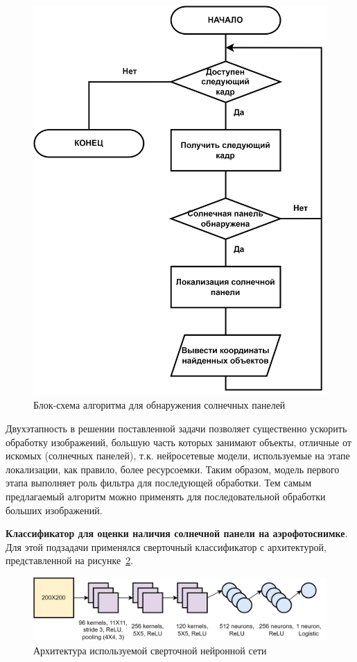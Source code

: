 \begin{figure}[ht]
	\centering
	\includegraphics[width=12cm]{man-source/images/ch4/pic4-16a.png}
	\caption{Блок-схема алгоритма для обнаружения солнечных панелей}
	\label{fig:solar_system_arch}
\end{figure}

Двухэтапность в решении поставленной задачи позволяет существенно ускорить обработку изображений, большую часть которых занимают объекты, отличные от искомых (солнечных панелей), т.к. нейросетевые модели, используемые на этапе локализации, как правило, более ресурсоемки. Таким образом, модель первого этапа выполняет роль фильтра для последующей обработки. Тем самым предлагаемый алгоритм можно применять для последовательной обработки больших изображений.

\textbf{Классификатор для оценки наличия солнечной панели на аэрофотоснимке}. Для этой подзадачи применялся сверточный классификатор с архитектурой, представленной на рисунке~\ref{fig:used_cnn}. 

\begin{figure}[ht]
	\centering
	\includegraphics[width=17cm]{man-source/images/ch4/pic4-19.png}
	\caption{Архитектура используемой сверточной нейронной сети}
	\label{fig:used_cnn}
\end{figure}


